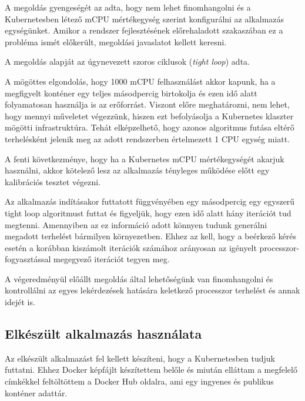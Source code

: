A megoldás gyengeségét az adta, hogy nem lehet finomhangolni és a Kubernetesben létező mCPU mértékegység szerint konfigurálni az alkalmazás egységünket.
Amikor a rendszer fejlesztésének előrehaladott szakaszában ez a probléma ismét előkerült, megoldási javaslatot kellett keresni.

A megoldás alapját az úgynevezett szoros ciklusok (\textit{tight loop}\citep{tightLoop}) adta.

A mögöttes elgondolás, hogy 1000 mCPU felhasználást akkor kapunk, ha a megfigyelt konténer egy teljes másodpercig birtokolja és ezen idő alatt folyamatosan használja is az erőforrást.
Viszont előre meghatározni, nem lehet, hogy mennyi műveletet végezzünk, hiszen ezt befolyásolja a Kubernetes klaszter mögötti infrastruktúra.
Tehát elképzelhető, hogy azonos algoritmus futása eltérő terhelésként jelenik meg az adott rendszerben értelmezett 1 CPU egység miatt.

A fenti következménye, hogy ha a Kubernetes mCPU mértékegységét akarjuk használni, akkor kötelező lesz az alkalmazás tényleges működése előtt egy kalibrációs tesztet végezni.

Az alkalmazás indításakor futtatott függvényében egy másodpercig egy egyszerű tight loop algoritmust futtat és figyeljük, hogy ezen idő alatt hány iterációt tud megtenni.
Amennyiben az ez információ adott könnyen tudunk generálni megadott terhelést bármilyen környezetben.
Ehhez az kell, hogy a beérkező kérés esetén a korábban kiszámolt iterációk számához arányosan az igényelt processzor-fogyasztással megegyező iterációt tegyen meg. 

A végeredményül előállt megoldás által lehetőségünk van finomhangolni és kontrollálni az egyes lekérdezések hatására keletkező processzor terhelést és annak idejét is. 

\subsection{Elkészült alkalmazás használata}
Az elkészült alkalmazást fel kellett készíteni, hogy a Kubernetesben tudjuk futtatni. Ehhez Docker képfájlt készítettem belőle és miután elláttam a megfelelő címkékkel feltöltöttem\citep{dockerContainer} a Docker Hub oldalra, ami egy ingyenes és publikus konténer adattár. \\

\lstset{caption=Konténer futtatása és válasza, label=describe_pod}


